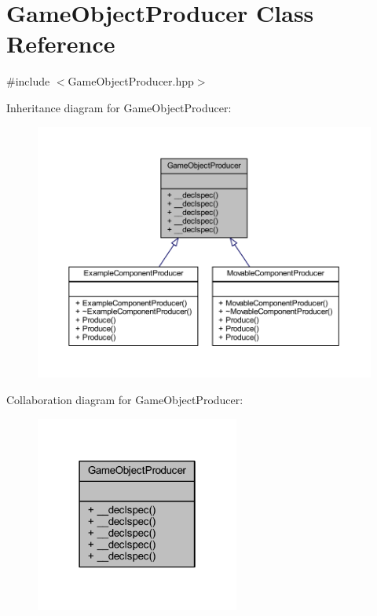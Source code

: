 \hypertarget{class_game_object_producer}{\section{Game\-Object\-Producer Class Reference}
\label{class_game_object_producer}
}


{\ttfamily \#include $<$Game\-Object\-Producer.\-hpp$>$}



Inheritance diagram for Game\-Object\-Producer\-:\nopagebreak
\begin{figure}[H]
\begin{center}
\leavevmode
\includegraphics[width=350pt]{class_game_object_producer__inherit__graph}
\end{center}
\end{figure}


Collaboration diagram for Game\-Object\-Producer\-:\nopagebreak
\begin{figure}[H]
\begin{center}
\leavevmode
\includegraphics[width=190pt]{class_game_object_producer__coll__graph}
\end{center}
\end{figure}
